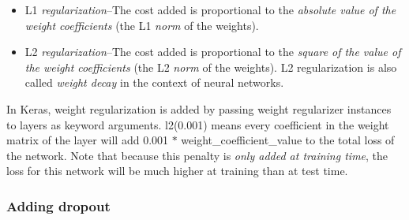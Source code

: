 \documentclass{article}
\numberwithin{equation}{section} %
\begin{document}
\begin{itemize}
	\item L1 \textit{regularization}--The cost added is proportional to the \textit{absolute value of the weight coefficients} (the L1 \textit{norm} of the weights).
	\item L2 \textit{regularization}--The cost added is proportional to the \textit{square of the value of the weight coefficients} (the L2 \textit{norm} of the weights). L2 regularization is also called \textit{weight decay} in the context of neural networks.
\end{itemize}

In Keras, weight regularization is added by passing weight regularizer instances to layers as keyword arguments. l2(0.001) means every coefficient in the weight matrix of the layer will add 0.001 $\ast$ weight\_coefficient\_value to the total loss of the network. Note that because this penalty is \textit{only added at training time}, the loss for this network will be much higher at training than at test time. \\

\subsubsection{Adding dropout}
\end{document}

